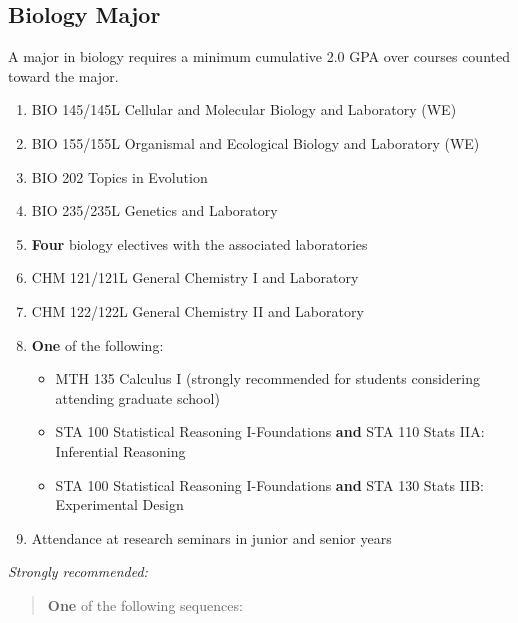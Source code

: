 \documentclass[
  letterpaper,
]{scrbook}
\providecommand{\tightlist}{%
  \setlength{\itemsep}{0pt}\setlength{\parskip}{0pt}}
\begin{document}
\subsection{Biology Major}\label{biology-major}

A major in biology requires a minimum cumulative 2.0 GPA over courses
counted toward the major.

\begin{enumerate}
\def\labelenumi{\arabic{enumi}.}
\tightlist
\item
  BIO 145/145L Cellular and Molecular Biology and Laboratory (WE)\\
\item
  BIO 155/155L Organismal and Ecological Biology and Laboratory (WE)\\
\item
  BIO 202 Topics in Evolution\\
\item
  BIO 235/235L Genetics and Laboratory\\
\item
  \textbf{Four} biology electives with the associated laboratories\\
\item
  CHM 121/121L General Chemistry I and Laboratory\\
\item
  CHM 122/122L General Chemistry II and Laboratory\\
\item
  \textbf{One} of the following:

  \begin{itemize}
  \tightlist
  \item
    MTH 135 Calculus I (strongly recommended for students considering
    attending graduate school)\\
  \item
    STA 100 Statistical Reasoning I-Foundations \textbf{and} STA 110
    Stats IIA: Inferential Reasoning\\
  \item
    STA 100 Statistical Reasoning I-Foundations \textbf{and} STA 130
    Stats IIB: Experimental Design\\
  \end{itemize}
\item
  Attendance at research seminars in junior and senior years
\end{enumerate}

\emph{Strongly recommended:}

\begin{quote}
\textbf{One} of the following sequences:
\end{quote}
\end{document}

